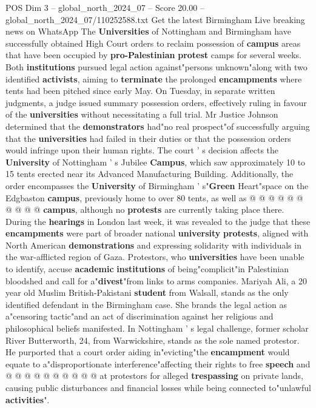 \begin{textsample}{POS Dim 3 – global\_north\_2024\_07 – Score 20.00 – global\_north\_2024\_07/110252588.txt}  \label{ex:f3_pos_085}
Get the latest Birmingham Live breaking news on WhatsApp The \textbf{Universities} of Nottingham and Birmingham have successfully obtained High Court orders to reclaim possession of \textbf{campus} areas that have been occupied by \textbf{pro-Palestinian} \textbf{protest} camps for several weeks.
Both \textbf{institutions} pursued legal action against"persons unknown"along with two identified \textbf{activists}, aiming to \textbf{terminate} the prolonged \textbf{encampments} where tents had been pitched since early May.
On Tuesday, in separate written judgments, a judge issued summary possession orders, effectively ruling in favour of the \textbf{universities} without necessitating a full trial.
Mr Justice Johnson determined that the \textbf{demonstrators} had"no real prospect"of successfully arguing that the \textbf{universities} had failed in their duties or that the possession orders would infringe upon their human rights.
The court ' s decision affects the \textbf{University} of Nottingham ' s Jubilee \textbf{Campus}, which saw approximately 10 to 15 tents erected near its Advanced Manufacturing Building.
Additionally, the order encompasses the \textbf{University} of Birmingham ' s"\textbf{Green} Heart"space on the Edgbaston \textbf{campus}, previously home to over 80 tents, as well as @ @ @ @ @ @ @ @ @ @ \textbf{campus}, although no \textbf{protests} are currently taking place there.
During the \textbf{hearings} in London last week, it was revealed to the judge that these \textbf{encampments} were part of broader national \textbf{university} \textbf{protests}, aligned with North American \textbf{demonstrations} and expressing solidarity with individuals in the war-afflicted region of Gaza.
Protestors, who \textbf{universities} have been unable to identify, accuse \textbf{academic} \textbf{institutions} of being"complicit"in Palestinian bloodshed and call for a"\textbf{divest}"from links to arms companies.
Mariyah Ali, a 20 year old Muslim British-Pakistani \textbf{student} from Walsall, stands as the only identified defendant in the Birmingham case.
She brands the legal action as a"censoring tactic"and an act of discrimination against her religious and philosophical beliefs manifested.
In Nottingham ' s legal challenge, former scholar River Butterworth, 24, from Warwickshire, stands as the sole named protestor.
He purported that a court order aiding in"evicting"the \textbf{encampment} would equate to a"disproportionate interference"affecting their rights to free \textbf{speech} and @ @ @ @ @ @ @ @ @ @ at protestors for alleged \textbf{trespassing} on private lands, causing public disturbances and financial losses while being connected to"unlawful \textbf{activities}".

\end{textsample}
